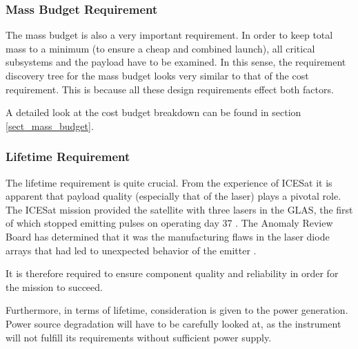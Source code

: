 \subsubsection{Mass Budget Requirement}
\label{blMBR} 
The mass budget is also a very important requirement. In order to keep total mass to a minimum (to ensure a cheap and combined launch), all critical subsystems and the payload have to be examined. In this sense, the requirement discovery tree for the mass budget looks very similar to that of the cost requirement. This is because all these design requirements effect both factors.

A detailed look at the cost budget breakdown can be found in section \ref{sect_mass_budget}.

\subsubsection{Lifetime Requirement}
\label{blLBR}

The lifetime requirement is quite crucial. From the experience of ICESat it is apparent that payload quality (especially that of the laser) plays a pivotal role. The ICESat mission provided the satellite with three lasers in the \ac{GLAS}, the first of which stopped emitting pulses on operating day 37 \cite{glasreview}. The Anomaly Review Board has determined that it was the manufacturing flaws in the laser diode arrays that had led to unexpected behavior of the emitter \cite{glasreview}.

It is therefore required to ensure component quality and reliability in order for the mission to succeed.

Furthermore, in terms of lifetime, consideration is given to the power generation. Power source degradation will have to be carefully looked at, as the instrument will not fulfill its requirements without sufficient power supply.

